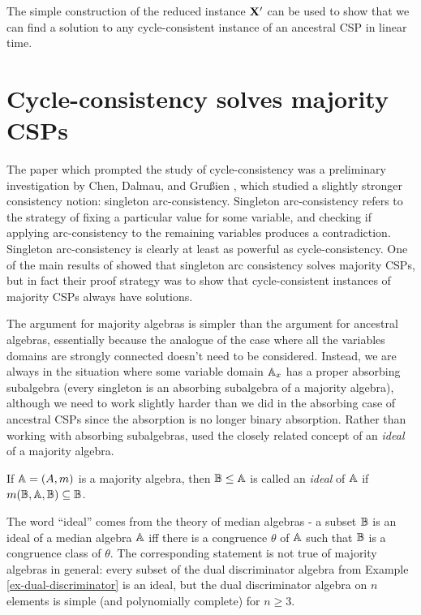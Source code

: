 \documentclass[letterpaper,11pt]{article}
\begin{document}
The simple construction of the reduced instance $\mathbf{X}'$ can be used to show that we can find a solution to any cycle-consistent instance of an ancestral CSP in linear time.


\section{Cycle-consistency solves majority CSPs}

The paper which prompted the study of cycle-consistency was a preliminary investigation by Chen, Dalmau, and Gru{\ss}ien \cite{arc}, which studied a slightly stronger consistency notion: singleton arc-consistency. Singleton arc-consistency refers to the strategy of fixing a particular value for some variable, and checking if applying arc-consistency to the remaining variables produces a contradiction. Singleton arc-consistency is clearly at least as powerful as cycle-consistency. One of the main results of \cite{arc} showed that singleton arc consistency solves majority CSPs, but in fact their proof strategy was to show that cycle-consistent instances of majority CSPs always have solutions.

The argument for majority algebras is simpler than the argument for ancestral algebras, essentially because the analogue of the case where all the variables domains are strongly connected doesn't need to be considered. Instead, we are always in the situation where some variable domain $\mathbb{A}_x$ has a proper absorbing subalgebra (every singleton is an absorbing subalgebra of a majority algebra), although we need to work slightly harder than we did in the absorbing case of ancestral CSPs since the absorption is no longer binary absorption. Rather than working with absorbing subalgebras, \cite{arc} used the closely related concept of an \emph{ideal} of a majority algebra.

\begin{defn} If $\mathbb{A} = (A,m)$ is a majority algebra, then $\mathbb{B} \le \mathbb{A}$ is called an \emph{ideal} of $\mathbb{A}$ if $m(\mathbb{B},\mathbb{A},\mathbb{B}) \subseteq \mathbb{B}$.
\end{defn}

The word ``ideal'' comes from the theory of median algebras - a subset $\mathbb{B}$ is an ideal of a median algebra $\mathbb{A}$ iff there is a congruence $\theta$ of $\mathbb{A}$ such that $\mathbb{B}$ is a congruence class of $\theta$. The corresponding statement is not true of majority algebras in general: every subset of the dual discriminator algebra from Example \ref{ex-dual-discriminator} is an ideal, but the dual discriminator algebra on $n$ elements is simple (and polynomially complete) for $n \ge 3$.
\end{document}
